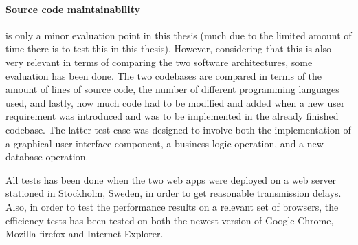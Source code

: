 \paragraph{Source code maintainability} is only a minor evaluation point in this thesis (much due to the limited amount of time there is to test this in this thesis). However, considering that this is also very relevant in terms of comparing the two software architectures, some evaluation has been done. The two codebases are compared in terms of the amount of lines of source code, the number of different programming languages used, and lastly, how much code had to be modified and added when a new user requirement was introduced and was to be implemented in the already finished codebase. The latter test case was designed to involve both the implementation of a graphical user interface component, a business logic operation, and a new database operation. 

All tests has been done when the two web apps were deployed on a web server stationed in Stockholm, Sweden, in order to get reasonable transmission delays. Also, in order to test the performance results on a relevant set of browsers, the efficiency tests has been tested on both the newest version of Google Chrome, Mozilla firefox and Internet Explorer.  


